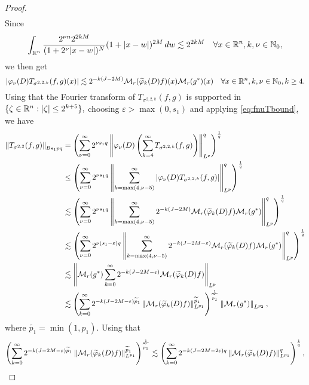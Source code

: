 \begin{proof}
\begin{align*}
\end{align*}
Since
\begin{align*}
\int_{{{\mathbb R}^n}}  \frac{2^{\nu n} 2^{2kM}}{(1+ 2^\nu |x- w|)^N}(1 +  |x-w|)^{2M} \, dw\lesssim 2^{2kM}\quad \forall x\in{{\mathbb R}^n}, k,\nu\in\mathbb{N}_0,
\end{align*}
we then get 
\begin{equation}\label{eq:fnuTbound}
|\varphi_\nu(D) T_{\sigma^{2,2,k}}(f,g)(x)|\lesssim  2^{-k (J-2M)} \mathcal{M}_r(\widetilde{\varphi}_k(D)f)(x) \mathcal{M}_r(g^*)(x)\quad \forall x\in{{\mathbb R}^n}, k,\nu\in\mathbb{N}_0, k\ge 4.
\end{equation}
 Using that  the Fourier transform of  $T_{\sigma^{2,2,k}}(f,g)$ is supported in $\{\zeta \in {{\mathbb R}^n}: |\zeta| \leq 2^{k+5} \},$ choosing $\varepsilon>\max(0,s_1)$ and applying   \eqref{eq:fnuTbound},  we have
\begin{align*}
 \left\|T_{\sigma^{2,2}}(f,g)\right\|_{\mathcal{B}{s_1}{p}{q}} &=  \left(\sum\limits_{\nu =0}^\infty 2^{\nu s_1q}\left\|\varphi_\nu(D) \left(\sum\limits_{k=4}^\infty T_{\sigma^{2,2,k}}(f,g)\right)\right\|_{L^p}^q \right)^\frac{1}{q}\\
&\le \left(\sum\limits_{\nu =0}^{\infty}  2^{\nu  s_1 q} \left\|\sum\limits_{k=\max(4,\nu -5)}^\infty \left| \varphi_\nu(D) T_{\sigma^{2,2,k}}(f,g)\right|\right\|_{L^p}^q \right)^\frac{1}{q}\\
& \lesssim \left(\sum\limits_{\nu =0}^{\infty}  2^{\nu  s_1q} \left\|\sum\limits_{k=\max(4,\nu -5)}^\infty 2^{-k (J-2M)}  \mathcal{M}_r(\widetilde{\varphi}_k(D)f) \mathcal{M}_r(g^*)\right\|_{L^p}^q \right)^\frac{1}{q}\\
& \lesssim \left(\sum\limits_{\nu =0}^{\infty}  2^{\nu  (s_1-\varepsilon) q} \left\|\sum\limits_{k=\max(4,\nu -5)}^\infty 2^{-k (J-2M-\varepsilon)}  \mathcal{M}_r(\widetilde{\varphi}_k(D)f) \mathcal{M}_r(g^*)\right\|_{L^p}^q \right)^\frac{1}{q}\\
&\lesssim\left\| \mathcal{M}_r(g^*) \sum\limits_{k=0}^\infty 2^{-k (J-2M-\varepsilon)}  \mathcal{M}_r(\widetilde{\varphi}_k(D)f) \right\|_{L^p}\\
&\lesssim \left(\sum\limits_{k=0}^\infty 2^{-k (J-2M-\varepsilon)\widetilde{p}_1} \left\|\mathcal{M}_r(\widetilde{\varphi}_k(D)f)\right\|_{L^{p_1}}^{\widetilde{p}_1} \right)^{\frac{1}{\widetilde{p}_1}}\left\|\mathcal{M}_r(g^*)\right\|_{L^{p_2}},
\end{align*}
where $\widetilde{p_1}=\min(1,p_1).$ Using that
$$
\left(\sum\limits_{k=0}^\infty 2^{-k (J-2M-\varepsilon)\widetilde{p}_1} \left\|\mathcal{M}_r(\widetilde{\varphi}_k(D)f)\right\|_{L^{p_1}}^{\widetilde{p}_1} \right)^{\frac{1}{\widetilde{p}_1}}\lesssim \left( \sum\limits_{k=0}^\infty 2^{-k  (J-2M -2\varepsilon)q} \left\|\mathcal{M}_r(\widetilde{\varphi}_k(D)f)\right\|_{L^{p_1}}^q  \right)^\frac{1}{q},
$$
\end{proof}
